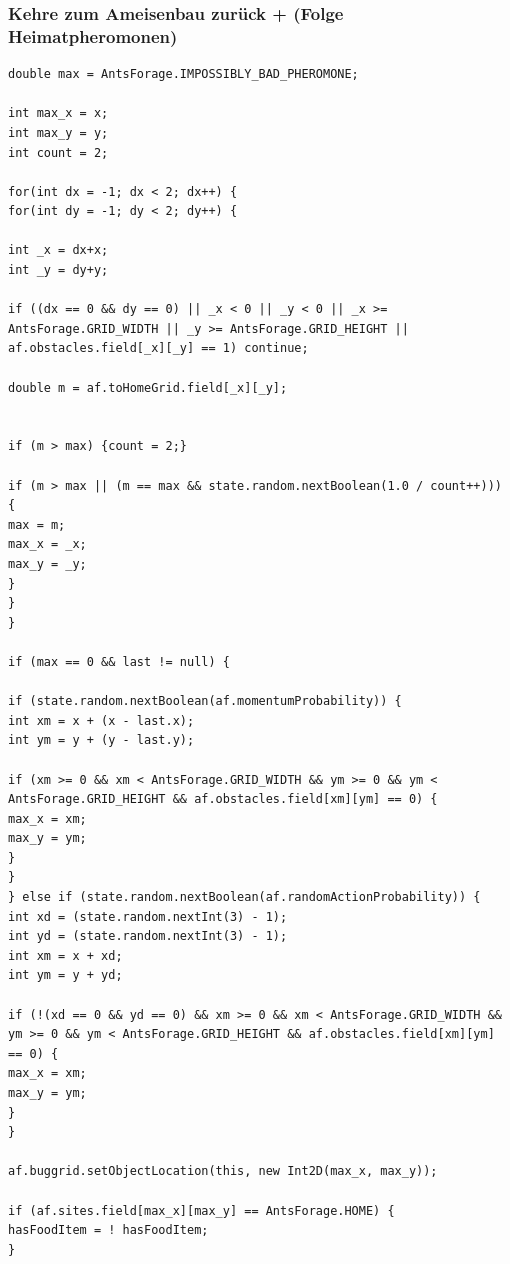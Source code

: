 \documentclass[a4paper, 11pt]{article}
\begin{document}
\subsubsection{Kehre zum Ameisenbau zurück + (Folge Heimatpheromonen)}
\begin{lstlisting}[caption= xxxxxxx,label = xxxx]
double max = AntsForage.IMPOSSIBLY_BAD_PHEROMONE;

int max_x = x;
int max_y = y;
int count = 2;

for(int dx = -1; dx < 2; dx++) {
for(int dy = -1; dy < 2; dy++) {

int _x = dx+x;
int _y = dy+y;

if ((dx == 0 && dy == 0) || _x < 0 || _y < 0 || _x >= AntsForage.GRID_WIDTH || _y >= AntsForage.GRID_HEIGHT ||  af.obstacles.field[_x][_y] == 1) continue;

double m = af.toHomeGrid.field[_x][_y];


if (m > max) {count = 2;}

if (m > max || (m == max && state.random.nextBoolean(1.0 / count++))) {
max = m;
max_x = _x;
max_y = _y;
}
}
}

if (max == 0 && last != null) {

if (state.random.nextBoolean(af.momentumProbability)) {
int xm = x + (x - last.x);
int ym = y + (y - last.y);

if (xm >= 0 && xm < AntsForage.GRID_WIDTH && ym >= 0 && ym < AntsForage.GRID_HEIGHT && af.obstacles.field[xm][ym] == 0) { 
max_x = xm; 
max_y = ym; 
}
}
} else if (state.random.nextBoolean(af.randomActionProbability)) {
int xd = (state.random.nextInt(3) - 1);
int yd = (state.random.nextInt(3) - 1);
int xm = x + xd;
int ym = y + yd;

if (!(xd == 0 && yd == 0) && xm >= 0 && xm < AntsForage.GRID_WIDTH && ym >= 0 && ym < AntsForage.GRID_HEIGHT && af.obstacles.field[xm][ym] == 0) { 
max_x = xm; 
max_y = ym; 
}
}

af.buggrid.setObjectLocation(this, new Int2D(max_x, max_y));

if (af.sites.field[max_x][max_y] == AntsForage.HOME) { 
hasFoodItem = ! hasFoodItem; 
}
\end{lstlisting}
\end{document}
